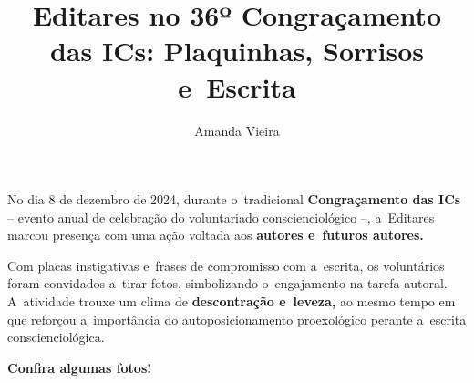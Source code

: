\documentclass{gescons}
\author{Amanda Vieira}
\title{Editares no 36º Congraçamento das ICs: Plaquinhas, Sorrisos e~Escrita}
\begin{document}
    \makeentrevistatitle


    






No dia 8 de dezembro de 2024, durante o~tradicional \textbf{Congraçamento das ICs} -- evento anual de celebração do voluntariado conscienciológico --, a~Editares marcou presença com uma ação voltada aos \textbf{autores e~futuros autores.}

Com placas instigativas e~frases de compromisso com a~escrita, os voluntários foram convidados a~tirar fotos, simbolizando o~engajamento na tarefa autoral. A~atividade trouxe um clima de \textbf{descontração e~leveza,} ao mesmo tempo em que reforçou a~importância do autoposicionamento proexológico perante a~escrita conscienciológica.

\textbf{Confira algumas fotos!}
\end{document}
